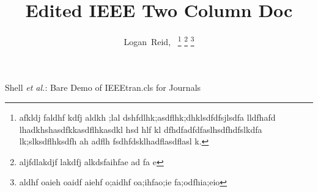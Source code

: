 \documentclass[journal]{IEEEtran}
\begin{document}
%
\title{Edited IEEE Two Column Doc}
%
%
%

\author{Logan~Reid,~
\thanks{afkldj faldhf kdfj aldkh ;lal dshfdlhk;asdflhk;dhklsdfdfsjlsdfa lldfhafd lhadkhshasdfkkasdflhkasdkl hsd hlf kl dfhdfadfdfaslhsdfhdfslkdfa lk;slksdflhksdfh ah adflh fsdhfdsklhadflasdflasl k.}%
\thanks{aljfdlakdjf lakdfj alkdsfaihfae ad fa e}%
\thanks{aldhf oaieh oaidf aiehf o;aidhf oa;ihfao;ie fa;odfhia;eio}}

% 
%



%
{Shell \MakeLowercase{\textit{et al.}}: Bare Demo of IEEEtran.cls for Journals}
% 
\end{document}
